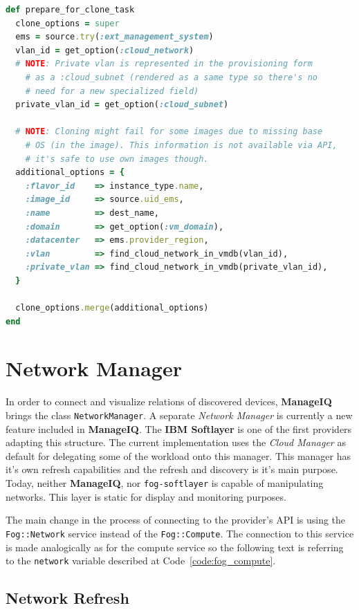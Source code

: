 \begin{lstlisting}[language=Ruby,caption={Prepare cloning options},label=code:cloning,float=htpb]
def prepare_for_clone_task
  clone_options = super
  ems = source.try(:ext_management_system)
  vlan_id = get_option(:cloud_network)
  # NOTE: Private vlan is represented in the provisioning form
	# as a :cloud_subnet (rendered as a same type so there's no
	# need for a new specialized field)
  private_vlan_id = get_option(:cloud_subnet)

  # NOTE: Cloning might fail for some images due to missing base
	# OS (in the image). This information is not available via API,
	# it's safe to use own images though.
  additional_options = {
    :flavor_id    => instance_type.name,
    :image_id     => source.uid_ems,
    :name         => dest_name,
    :domain       => get_option(:vm_domain),
    :datacenter   => ems.provider_region,
    :vlan         => find_cloud_network_in_vmdb(vlan_id),
    :private_vlan => find_cloud_network_in_vmdb(private_vlan_id),
  }

  clone_options.merge(additional_options)
end
\end{lstlisting}

\clearpage
\section{Network Manager}
\label{sec:Network Manager}

In order to connect and visualize relations of discovered devices, \textbf{ManageIQ} brings the class \verb|NetworkManager|. A separate \emph{Network Manager} is currently a new feature included in \textbf{ManageIQ}. The \textbf{IBM Softlayer} is one of the first providers adapting this structure. The current implementation uses the \emph{Cloud Manager} as default for delegating some of the workload onto this manager. This manager has it's own refresh capabilities and the refresh and discovery is it's main purpose. Today, neither \textbf{ManageIQ}, nor \texttt{fog-softlayer} is capable of manipulating networks. This layer is static for display and monitoring purposes.

The main change in the process of connecting to the provider's API is using the \verb|Fog::Network| service instead of the \verb|Fog::Compute|. The connection to this service is made analogically as for the compute service so the following text is referring to the \verb|network| variable described at Code~\ref{code:fog_compute}.

\subsection{Network Refresh}
\label{sub:Network Refresh}

